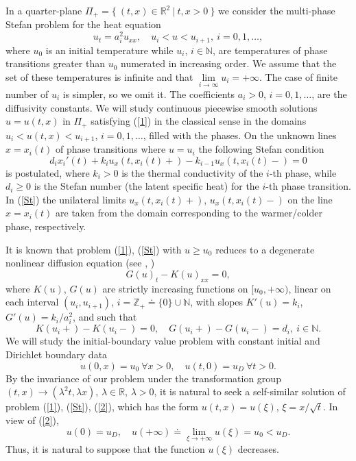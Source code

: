\documentclass[12pt]{article}
\theoremstyle{plain}
\theoremstyle{definition}
\numberwithin{equation}{section}
\newcommand{\R}{{\mathbb R}}
\newcommand{\N}{{\mathbb N}}
\newcommand{\Z}{{\mathbb Z}}
\begin{document}
In a quarter-plane $\Pi_+=\{ \ (t,x)\in\R^2 \ | \ t,x>0 \ \}$ we consider the multi-phase Stefan problem for the heat equation
\begin{equation}\label{1}
u_t=a_i^2u_{xx}, \quad u_i<u<u_{i+1}, \ i=0,1,\ldots,
\end{equation}
where $u_0$ is an initial temperature while $u_i$, $i\in\N$, are temperatures of phase transitions greater than $u_0$ numerated in increasing order. We assume that the set of these temperatures is infinite and that $\lim\limits_{i\to\infty} u_i=+\infty$. The case of finite number of $u_i$ is simpler, so we omit it.
The coefficients $a_i>0$, $i=0,1,\ldots$, are the diffusivity constants. We will study continuous piecewise smooth solutions $u=u(t,x)$ in $\Pi_+$ satisfying (\ref{1}) in the classical sense in the domains $u_i<u(t,x)<u_{i+1}$, $i=0,1,\ldots$, filled with the phases. On the unknown lines $x=x_i(t)$ of phase transitions where $u=u_i$ the following Stefan condition
\begin{equation}\label{St}
d_ix_i'(t)+k_iu_x(t,x_i(t)+)-k_{i-1}u_x(t,x_i(t)-)=0
\end{equation}
is postulated, where $k_i>0$ is the thermal conductivity of the $i$-th phase, while $d_i\ge 0$ is the Stefan number (the latent specific heat) for the $i$-th phase transition. In (\ref{St}) the unilateral limits $u_x(t,x_i(t)+)$, $u_x(t,x_i(t)-)$ on the line $x=x_i(t)$ are taken from the domain corresponding to the warmer/colder phase, respectively. 

It is known that problem (\ref{1}), (\ref{St}) with $u\ge u_0$ reduces to a degenerate nonlinear diffusion  equation (see \cite{Kam}, \cite[Chapter 5]{LSU})
\begin{equation}\label{diff}
G(u)_t-K(u)_{xx}=0,
\end{equation}
where $K(u)$, $G(u)$ are strictly increasing functions on $[u_0,+\infty)$, linear on each interval $(u_i,u_{i+1})$,
$i=\Z_+\doteq\{0\}\cup\N$, with slopes $K'(u)=k_i$, $G'(u)=k_i/a_i^2$, and such that
\[
K(u_i+)-K(u_i-)=0, \quad G(u_i+)-G(u_i-)=d_i, \ i\in\N.
\]
We will study the initial-boundary value problem with constant initial and Dirichlet boundary data
\begin{equation}\label{2}
u(0,x)=u_0 \ \forall x>0, \quad u(t,0)=u_D \ \forall t>0.
\end{equation}
By the invariance of our problem under the transformation group
$(t,x)\to (\lambda^2 t, \lambda x)$, $\lambda\in\R$, $\lambda>0$, it is natural to seek a self-similar solution of problem (\ref{1}), (\ref{St}), (\ref{2}), which has the form $u(t,x)=u(\xi)$, $\xi=x/\sqrt{t}$. In view of (\ref{2}),
\[u(0)=u_D, \quad u(+\infty)\doteq\lim_{\xi\to+\infty} u(\xi)=u_0<u_D.\]
Thus, it is natural to suppose that the function $u(\xi)$ decreases.
\end{document}
